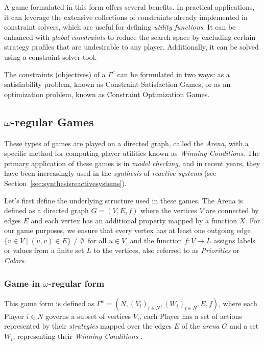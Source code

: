 \documentclass{article}
\begin{document}
A game formulated in this form offers several benefits. In practical applications, it can leverage the extensive collections of constraints already implemented in constraint solvers, which are useful for defining \textit{utility functions}. It can be enhanced with \textit{global constraints} to reduce the search space by excluding certain strategy profiles that are undesirable to any player. Additionally, it can be solved using a constraint solver tool.

The constraints (objectives) of a $\Gamma^c$ can be formulated in two ways: as a satisfiability problem, known as Constraint Satisfaction Games, or as an optimization problem, known as Constraint Optimization Games.

\subsection{$\omega$-regular Games}\label{sec:wregulargames}

These types of games are played on a directed graph, called the \textit{Arena}, with a specific method for computing player utilities known as \textit{Winning Conditions}. The primary application of these games is in \textit{model checking}, and in recent years, they have been increasingly used in the \textit{synthesis} of \textit{reactive systems} (see Section~\ref{sec:synthesisreactivesystems}).

Let’s first define the underlying structure used in these games. The Arena is defined as a directed graph $G =(V,E,f)$ where the vertices $V$ are connected by edges $E$ and each vertex has an additional property mapped by a function $X$.  For our game purposes, we ensure that every vertex has at least one outgoing edge $\{v \in V \mid (u,v) \in E \} \neq \emptyset\ $ for all $u \in V$, and the function \( f: V \rightarrow L \) assigns labels or values from a finite set \( L \) to the vertices, also referred to as \textit{Priorities} or \textit{Colors}. \cite{Erich2008SCaA}

\subsubsection{Game in $\omega$-regular form} 
This game form is defined as $\Gamma^\omega =(N,(V_i)_{i \in N},(W_i)_{i \in N},E,f)$, where each Player $i \in N$ governs a subset of vertices $V_i$, each Player has a set of actions represented by their \textit{strategies} mapped over the edges $E$ of the \textit{arena} $G$ and a set $W_i$, representing their \textit{Winning Conditions} \cite{Erich2008SCaA}.
\end{document}
